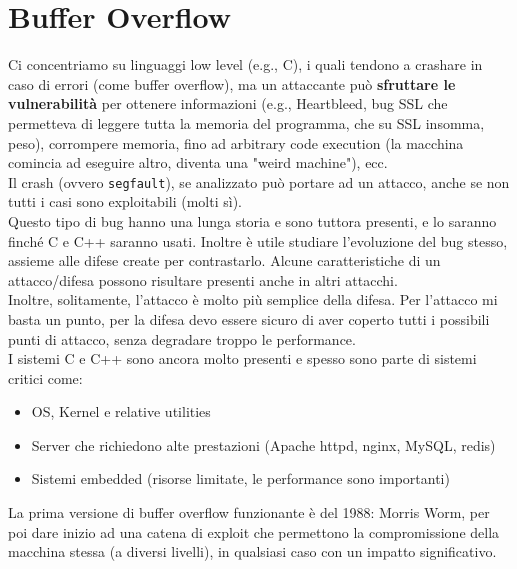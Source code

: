 \section{Buffer Overflow}

Ci concentriamo su linguaggi low level (e.g., C), i quali tendono a crashare in caso di errori (come buffer overflow), ma un attaccante può \textbf{sfruttare le vulnerabilità} per ottenere informazioni (e.g., Heartbleed, bug SSL che permetteva di leggere tutta la memoria del programma, che su SSL insomma, peso), corrompere memoria, fino ad arbitrary code execution (la macchina comincia ad eseguire altro, diventa una "weird machine"), ecc.\\
Il crash (ovvero \texttt{segfault}), se analizzato può portare ad un attacco, anche se non tutti i casi sono exploitabili (molti sì).\\

Questo tipo di bug hanno una lunga storia e sono tuttora presenti, e lo saranno finché C e C++ saranno usati. Inoltre è utile studiare l'evoluzione del bug stesso, assieme alle difese create per contrastarlo. Alcune caratteristiche di un attacco/difesa possono risultare presenti anche in altri attacchi.\\

Inoltre, solitamente, l'attacco è molto più semplice della difesa. Per l'attacco mi basta un punto, per la difesa devo essere sicuro di aver coperto tutti i possibili punti di attacco, senza degradare troppo le performance.\\

I sistemi C e C++ sono ancora molto presenti e spesso sono parte di sistemi critici come: 
\begin{itemize}
	\item OS, Kernel e relative utilities
	\item Server che richiedono alte prestazioni (Apache httpd, nginx, MySQL, redis)
	\item Sistemi embedded (risorse limitate, le performance sono importanti)
\end{itemize}

La prima versione di buffer overflow funzionante è del 1988: Morris Worm, per poi dare inizio ad una catena di exploit che permettono la compromissione della macchina stessa (a diversi livelli), in qualsiasi caso con un impatto significativo.\\


